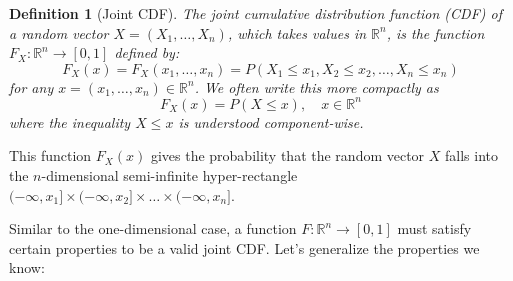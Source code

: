 \documentclass[11pt, a4paper]{article}
\newtheorem{definition}[theorem]{Definition}
\theoremstyle{definition} %
\newcommand{\R}{\mathbb{R}}
\begin{document}
\begin{definition}[Joint CDF] \label{def:joint_cdf}
The joint cumulative distribution function (CDF) of a random vector $X = (X_1, \dots, X_n)$, which takes values in $\R^n$, is the function $F_X: \R^n \to [0, 1]$ defined by:
\[ F_X(x) = F_X(x_1, \dots, x_n) = P(X_1 \le x_1, X_2 \le x_2, \dots, X_n \le x_n) \]
for any $x = (x_1, \dots, x_n) \in \R^n$. We often write this more compactly as
\[ F_X(x) = P(X \le x), \quad x \in \R^n \]
where the inequality $X \le x$ is understood component-wise.
\end{definition}

This function $F_X(x)$ gives the probability that the random vector $X$ falls into the $n$-dimensional semi-infinite hyper-rectangle $(-\infty, x_1] \times (-\infty, x_2] \times \dots \times (-\infty, x_n]$.

Similar to the one-dimensional case, a function $F: \R^n \to [0, 1]$ must satisfy certain properties to be a valid joint CDF. Let's generalize the properties we know:
\end{document}
